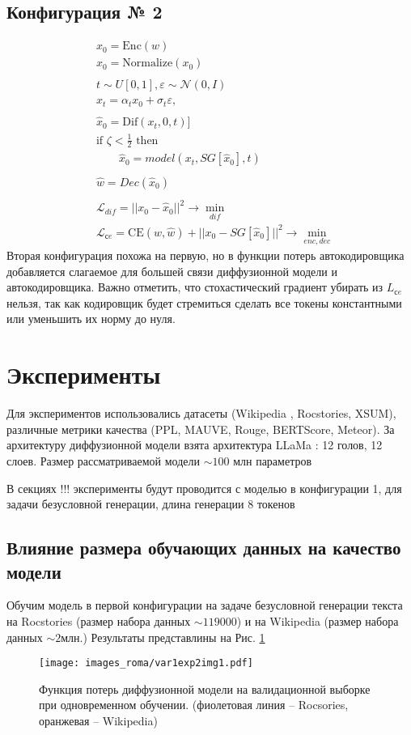 \documentclass[12pt,a4paper]{article}
\begin{document}
\subsection{Конфигурация № 2}
\begin{align} 
& x_0 = \text{Enc}(w) \\
& x_0 = \text{Normalize}(x_0) \\\\
& t \sim U[0, 1], \varepsilon \sim \mathcal{N}(0, I)\\ 
& x_t = \alpha_t x_0 + \sigma_t \varepsilon, \\\\
& \hat{x}_0 = \text{Dif}(x_t, 0, t)] \\
& \text{if }\zeta < \frac{1}{2} \text{ then } \\
& \qquad \hat{x}_0 = model(x_t, SG[\hat{x}_0], t) \\\\
& \hat{w} = Dec(\hat{x}_0)\\\\
& \mathcal{L}_{dif} = ||x_0 - \hat{x}_0||^2 \rightarrow \min_{dif} \\
& \mathcal{L}_{сe} = \text{CE}(w, \hat{w}) + ||x_0 - SG[\hat{x}_0]||^2 \rightarrow \min_{enc, dec}
\end{align} 
Вторая конфигурация похожа на первую, но в функции потерь автокодировщика добавляется слагаемое для большей связи диффузионной модели и автокодировщика.
Важно отметить, что стохастический градиент убирать из $L_{сe}$ нельзя, так как кодировщик будет стремиться сделать все токены константными или уменьшить их норму до нуля.

\section{Эксперименты}

Для экспериментов использовались датасеты (Wikipedia \cite{dodge2021documenting}, Rocstories, XSUM), различные метрики качества (PPL, MAUVE, Rouge, BERTScore, Meteor). За архитектуру диффузионной модели взята архитектура LLaMa \cite{touvron2023llamaopenefficientfoundation}: 12 голов, 12 слоев. Размер рассматриваемой модели $\sim100$ млн параметров

В секциях !!! эксперименты будут проводится с моделью в конфигурации 1, для задачи безусловной генерации, длина генерации 8 токенов

\subsection{Влияние размера обучающих данных на качество модели}
Обучим модель в первой конфигурации на задаче безусловной генерации текста на Rocstories (размер набора данных $\sim 119000$) и на Wikipedia (размер набора данных $\sim 2$млн.) Результаты представлины на Рис. \ref{fig:1}
\begin{figure}[h!]
\centering
\texttt{[image: images\_roma/var1exp2img1.pdf]}
\caption{Функция потерь диффузионной модели на валидационной выборке при одновременном обучении. (фиолетовая линия -- Rocsories, оранжевая -- Wikipedia)}
\label{fig:1}
\end{figure}
\end{document}
